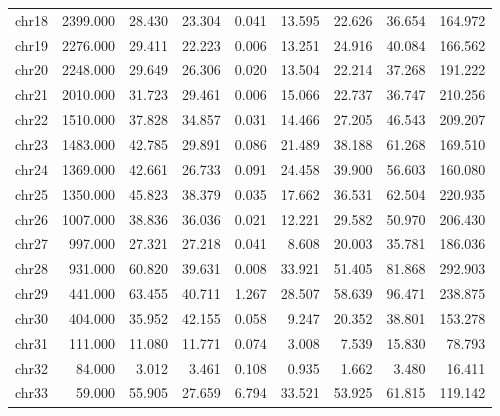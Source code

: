 \documentclass{article}
\begin{document}
\begin{table}[htbp]
{\begin{tabular}{lrrrrrrrr}
chr18 & 2399.000 & 28.430 & 23.304 & 0.041 & 13.595 & 22.626 & 36.654 & 164.972 \\
chr19 & 2276.000 & 29.411 & 22.223 & 0.006 & 13.251 & 24.916 & 40.084 & 166.562 \\
chr20 & 2248.000 & 29.649 & 26.306 & 0.020 & 13.504 & 22.214 & 37.268 & 191.222 \\
chr21 & 2010.000 & 31.723 & 29.461 & 0.006 & 15.066 & 22.737 & 36.747 & 210.256 \\
chr22 & 1510.000 & 37.828 & 34.857 & 0.031 & 14.466 & 27.205 & 46.543 & 209.207 \\
chr23 & 1483.000 & 42.785 & 29.891 & 0.086 & 21.489 & 38.188 & 61.268 & 169.510 \\
chr24 & 1369.000 & 42.661 & 26.733 & 0.091 & 24.458 & 39.900 & 56.603 & 160.080 \\
chr25 & 1350.000 & 45.823 & 38.379 & 0.035 & 17.662 & 36.531 & 62.504 & 220.935 \\
chr26 & 1007.000 & 38.836 & 36.036 & 0.021 & 12.221 & 29.582 & 50.970 & 206.430 \\
chr27 & 997.000 & 27.321 & 27.218 & 0.041 & 8.608 & 20.003 & 35.781 & 186.036 \\
chr28 & 931.000 & 60.820 & 39.631 & 0.008 & 33.921 & 51.405 & 81.868 & 292.903 \\
chr29 & 441.000 & 63.455 & 40.711 & 1.267 & 28.507 & 58.639 & 96.471 & 238.875 \\
chr30 & 404.000 & 35.952 & 42.155 & 0.058 & 9.247 & 20.352 & 38.801 & 153.278 \\
chr31 & 111.000 & 11.080 & 11.771 & 0.074 & 3.008 & 7.539 & 15.830 & 78.793 \\
chr32 & 84.000 & 3.012 & 3.461 & 0.108 & 0.935 & 1.662 & 3.480 & 16.411 \\
chr33 & 59.000 & 55.905 & 27.659 & 6.794 & 33.521 & 53.925 & 61.815 & 119.142 \\
\bottomrule
\end{tabular}
}
\end{table}
\end{document}
